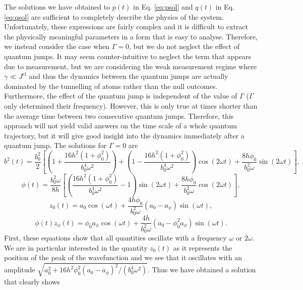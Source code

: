 The solutions we have obtained to $p(t)$ in Eq. \eqref{eq:psol} and
$q(t)$ in Eq. \eqref{eq:qsol} are sufficient to completely describe
the physics of the system. Unfortunately, these expressions are fairly
complex and it is difficult to extract the physically meaningful
parameters in a form that is easy to analyse. Therefore, we instead
consider the case when $\Gamma = 0$, but we do not neglect the effect
of quantum jumps. It may seem counter-intuitive to neglect the term
that appears due to measurement, but we are considering the weak
measurement regime where $\gamma \ll J^\mathrm{cl}$ and thus the
dynamics between the quantum jumps are actually dominated by the
tunnelling of atoms rather than the null outcomes. Furthermore, the
effect of the quantum jump is independent of the value of $\Gamma$
($\Gamma$ only determined their frequency). However, this is only true
at times shorter than the average time between two consecutive quantum
jumps. Therefore, this approach will not yield valid answers on the
time scale of a whole quantum trajectory, but it will give good
insight into the dynamics immediately after a quantum jump. The
solutions for $\Gamma = 0$ are
\begin{equation}
b^2(t) = \frac{b_0^2}{2} \left[ \left(1 + \frac{16 h^2 (1 + \phi_0^2)}
    {b_0^4 \omega^2} \right) + \left(1 - \frac{16 h^2 (1 + \phi_0^2)}
    {b_0^4 \omega^2} \right) \cos (2 \omega t) + \frac{8 h \phi_0}{b_0^2
    \omega} \sin(2 \omega t) \right],
\end{equation}
\begin{equation}
  \phi(t) = \frac{b_0^2 \omega} {8 h} \left[ \left( \frac{16 h^2 (1 + \phi_0^2)}
      {b_0^4 \omega^2} - 1 \right) \sin (2 \omega t) + \frac{8 h
      \phi_0} {b_0^2 \omega} \cos (2 \omega t) \right],
\end{equation}
\begin{equation}
  z_0(t) = a_0 \cos(\omega t) + \frac{4 h \phi_0} {b_0^2 \omega} (a_0 -
  a_\phi) \sin (\omega t),
\end{equation}
\begin{equation}
  \phi(t) z_\phi(t) = \phi_0 a_\phi \cos (\omega t)  + \frac{4 h}
  {b_0^2 \omega} (a_0 - \phi_0^2 a_\phi) \sin( \omega t).
\end{equation}
First, these equations show that all quantities oscillate with a
frequency $\omega$ or $2 \omega$. We are in particular interested in
the quantity $z_0(t)$ as it represents the position of the peak of the
wavefunction and we see that it oscillates with an amplitude
$\sqrt{a_0^2 + 16 h^2 \phi_0^2 (a_0 - a_\phi)^2 / (b_0^4
  \omega^2)}$. Thus we have obtained a solution that clearly shows

